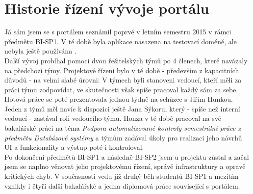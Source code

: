 \section{Historie řízení vývoje portálu} \label{intro:management}

Já sám jsem se s portálem seznámil poprvé v letním semestru 2015 v rámci předmětu BI-SP1. V té době byla aplikace nasazena na testovací doméně, ale nebyla ještě používána .\\
Další vývoj probíhal pomocí dvou řešitelských týmů po 4 členech, které navázaly na předchozí týmy. Projektové řízení bylo v té době - především z kapacitních důvodů - na velmi slabé úrovni: V týmech byli stanoveni vedoucí, kteří měli za práci týmu zodpovídat, ve skutečnosti však spíše pracoval každý sám za sebe. Hotová práce se poté prezentovala jednou týdně na schůzce s Jiřím Hunkou. Jeden z týmů měl navíc k dispozici ještě Jana Sýkoru, který - spíše než interní vedoucí - zastával roli vedoucího týmu. Honza v té době pracoval na své bakalářské práci na téma \emph{Podpora automatizované kontroly semestrální práce z předmětu Databázové systémy} a týmům zadával úkoly pro realizaci jeho návrhů UI a funkcionality a výstup poté i kontroloval.\\
Po dokončení předmětů BI-SP1 a následně BI-SP2 jsem u projektu zůstal a začal jsem se naplno věnovat jeho projektovému řízení, správě infrastruktury a opravě kritických chyb. V současnosti vedu již druhý běh studentů BI-SP1 a mezitím vznikly i čtyři další bakalářské a jedna diplomová práce související s portálem.
